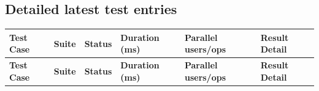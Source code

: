 \documentclass[a4paper, 11pt]{article}
\begin{document}
\subsection{Detailed latest test entries}
\small
\renewcommand{\arraystretch}{1.2}
\begin{longtable}{|p{3.8cm}|p{1.4cm}|p{1.3cm}|p{1.7cm}|p{2.8cm}|p{4.6cm}|}
\hline
\rowcolor{HeaderGray}
\textbf{Test Case} & \textbf{Suite} & \textbf{Status} & \textbf{Duration (ms)} & \textbf{Parallel users/ops} & \textbf{Result Detail} \\ \hline
\endfirsthead

\hline
\rowcolor{HeaderGray}
\textbf{Test Case} & \textbf{Suite} & \textbf{Status} & \textbf{Duration (ms)} & \textbf{Parallel users/ops} & \textbf{Result Detail} \\ \hline
\endhead


\end{longtable}
\end{document}
